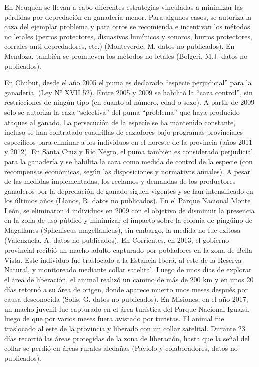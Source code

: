 \documentclass[
  x11names]{article}
\begin{document}
En Neuquén se llevan a cabo diferentes estrategias vinculadas a
minimizar las pérdidas por depredación en ganadería menor. Para algunos
casos, se autoriza la caza del ejemplar problema y para otros se
recomienda e incentivan los métodos no letales (perros protectores,
disuasivos lumínicos y sonoros, burros protectores, corrales
anti-depredadores, etc.) (Monteverde, M. datos no publicados). En
Mendoza, también se promueven los métodos no letales (Bolgeri, M.J.
datos no publicados).

En Chubut, desde el año 2005 el puma es declarado ``especie
perjudicial'' para la ganadería, (Ley N° XVII 52). Entre 2005 y 2009 se
habilitó la ``caza control'', sin restricciones de ningún tipo (en
cuanto al número, edad o sexo). A partir de 2009 sólo se autoriza la
caza ``selectiva'' del puma ``problema'' que haya producido ataques al
ganado. La persecución de la especie se ha mantenido constante, incluso
se han contratado cuadrillas de cazadores bajo programas provinciales
específicos para eliminar a los individuos en el noreste de la provincia
(años 2011 y 2012). En Santa Cruz y Río Negro, el puma también es
considerado perjudicial para la ganadería y se habilita la caza como
medida de control de la especie (con recompensas económicas, según las
disposiciones y normativas anuales). A pesar de las medidas
implementadas, los reclamos y demandas de los productores ganaderos por
la depredación de ganado siguen vigentes y se han intensificado en los
últimos años (Llanos, R. datos no publicados). En el Parque Nacional
Monte León, se eliminaron 4 individuos en 2009 con el objetivo de
disminuir la presencia en la zona de uso público y minimizar el impacto
sobre la colonia de pingüino de Magallanes (Spheniscus magellanicus),
sin embargo, la medida no fue exitosa (Valenzuela, A. datos no
publicados). En Corrientes, en 2013, el gobierno provincial recibió un
macho adulto capturado por pobladores en la zona de Bella Vista. Este
individuo fue traslocado a la Estancia Iberá, al este de la Reserva
Natural, y monitoreado mediante collar satelital. Luego de unos días de
explorar el área de liberación, el animal realizó un camino de más de
200 km y en unos 20 días retornó a su área de origen, donde aparece
muerto unos meses después por causa desconocida (Solis, G. datos no
publicados). En Misiones, en el año 2017, un macho juvenil fue capturado
en el área turística del Parque Nacional Iguazú, luego de que por varios
meses fuera avistado por turistas. El animal fue traslocado al este de
la provincia y liberado con un collar satelital. Durante 23 días
recorrió las áreas protegidas de la zona de liberación, hasta que la
señal del collar se perdió en áreas rurales aledañas (Paviolo y
colaboradores, datos no publicados).
\end{document}
